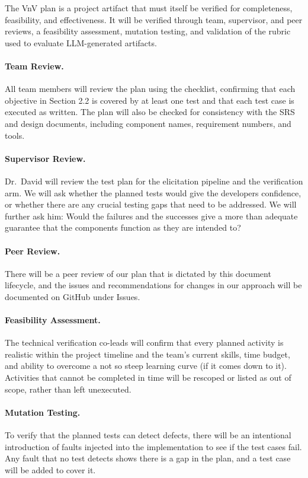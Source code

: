 \documentclass[12pt, titlepage]{article}
\begin{document}
The VnV plan is a project artifact that must itself be verified for
completeness, feasibility, and effectiveness. It will be verified
through team, supervisor, and peer reviews, a feasibility assessment,
mutation testing, and validation of the rubric used to evaluate
LLM-generated artifacts.

\paragraph{Team Review.}
All team members will review the plan using the checklist, confirming that
each objective in Section 2.2 is covered by at least one test and that each
test case is executed as written. The plan will also be checked for
consistency with the SRS and design documents, including component names,
requirement numbers, and tools.

\paragraph{Supervisor Review.}
Dr.\ David will review the test plan for the elicitation pipeline and the
verification arm. We will ask whether the planned tests would give the
developers confidence, or whether there are any crucial testing gaps that
need to be addressed. We will further ask him: Would the failures and the
successes give a more than adequate guarantee that the components function
as they are intended to?

\paragraph{Peer Review.}
There will be a peer review of our plan that is dictated by this document lifecycle, and the issues and recommendations for changes in our approach will be documented on GitHub under Issues.

\paragraph{Feasibility Assessment.}
The technical verification co-leads will confirm that every planned activity is realistic within the project timeline and the team's current skills, time budget, and ability to overcome a not so steep learning curve (if it comes down to it). Activities that cannot be completed in time will be rescoped or listed as out of scope, rather than left unexecuted.

\paragraph{Mutation Testing.}
To verify that the planned tests can detect defects, there will be an intentional introduction of faults injected into the implementation to see if the test cases fail. Any fault that no test detects shows there is a gap in the plan, and a test case will be added to cover it.
\end{document}
